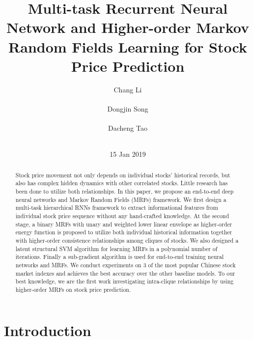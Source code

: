 \documentclass[sigconf, anonymous, review]{acmart}
\begin{document}
\title{ Multi-task Recurrent Neural Network and
  Higher-order Markov Random Fields Learning for Stock Price
  Prediction}


\author{
\alignauthor Chang Li \\
       \\
\alignauthor Dongjin Song \\
       \\
\alignauthor Dacheng Tao\\
       \\
}
\date{15 Jan 2019}


\begin{abstract}
  Stock price movement not only depends on individual stocks'
  historical records, but also has complex hidden dynamics with
  other correlated stocks. Little research has been done to
  utilize both relationships. In this paper, we propose an
  end-to-end deep neural networks and Markov Random Fields (MRFs)
  framework. We first design a
  multi-task hierarchical RNNs framework to extract informational
  features from individual stock price sequence without any
  hand-crafted knowledge. At the second stage, a binary MRFs with
  unary and weighted lower linear envelope as higher-order energy
  function is proposed to utilize both individual historical
  information together with higher-order consistence
  relationships among cliques of stocks. We also designed a
  latent structural SVM algorithm for learning MRFs in a
  polynomial number of iterations. Finally a sub-gradient
  algorithm is used for end-to-end training neural networks and
  MRFs. We conduct experiments on 3 of the most popular Chinese
  stock market indexes and achieves the best accuracy over the
  other baseline models. To our best knowledge, we are the first
  work investigating intra-clique relationships by using
  higher-order MRFs on stock price prediction.
\end{abstract}

\maketitle

\section{Introduction}
\label{sec:intro}
\end{document}
